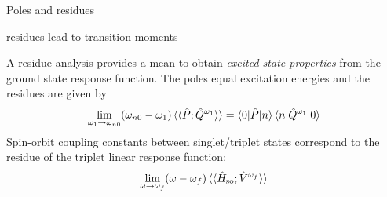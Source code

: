 \documentclass[%
class = book,%
crop = false,%
float = true,%
multi = true,%
preview = false,%
]{standalone}
\begin{document}
Poles and residues

residues lead to transition moments

A residue analysis provides a mean to obtain \textit{excited state properties} from the ground state response function. The poles equal excitation energies and the residues are given by
\begin{equation*}
  \lim_{\omega_{1} \to \omega_{n0}} (\omega_{n0} - \omega_{1}) \braket{\braket{\hat{P};\hat{Q}^{\omega_{1}}}} = \braket{0|\hat{P}|n} \braket{n|\hat{Q}^{\omega_{1}}|0}
\end{equation*}
Spin-orbit coupling constants between singlet/triplet states correspond to the residue of the triplet linear response function:
\begin{equation*}
  \lim_{\omega \to \omega_{f}} (\omega - \omega_{f}) \braket{\braket{\hat{H}_{\text{so}};\hat{V}^{\omega_{f}}}}
\end{equation*}
\end{document}
